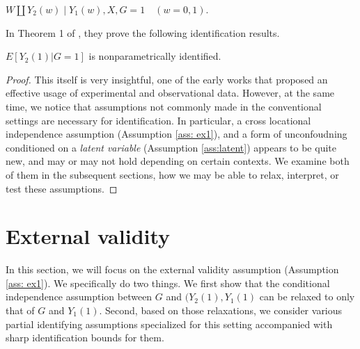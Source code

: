 \documentclass[uplatex,dvipdfmx]{jsarticle}
\begin{document}
\begin{assumption} \label{ass:latent}
    $W \amalg Y_2(w) \mid Y_1(w), X, G=1\quad(w =0,1)$.
\end{assumption}

In Theorem 1 of \cite{athey2020combining}, they prove the following identification results. 
\begin{theorem}
    $E[ Y_2(1) | G = 1 ]$ is nonparametrically identified.
\end{theorem}
\begin{proof}
    This itself is very insightful, one of the early works that proposed an effective usage of experimental and observational data. However, at the same time, we notice that assumptions not commonly made in the conventional settings are necessary for identification. In particular, a cross locational independence assumption (Assumption \ref{ass: ex1}), and a form of unconfoudning conditioned on a \textit{latent variable} (Assumption \ref{ass:latent}) appears to be quite new, and may or may not hold depending on certain contexts. We examine both of them in the subsequent sections, how we may be able to relax, interpret, or test these assumptions.
\end{proof}

\section{External validity}
In this section, we will focus on the external validity assumption (Assumption \ref{ass: ex1}). We specifically do two things. We first show that the conditional independence assumption between $G$ and $(Y_2(1), Y_1(1)$ can be relaxed to only that of $G$ and $Y_1(1)$. Second, based on those relaxations, we consider various partial identifying assumptions specialized for this setting accompanied with sharp identification bounds for them. 
\end{document}
